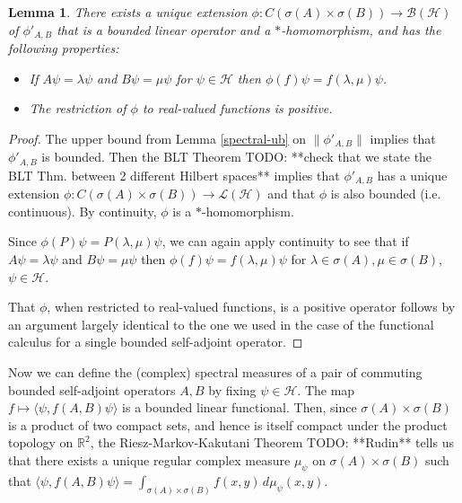 \documentclass[12pt,oneside]{report}
\newtheorem{lem}[thm]{Lemma}
\begin{document}
\begin{lem}
    There exists a unique extension $\phi: C(\sigma(A) \times \sigma(B)) \to \mathscr{B}(\mathscr{H})$ of $\phi'_{A,B}$ that is a bounded linear operator and a $*$-homomorphism, and has the following properties:
    \begin{itemize}
        \item If $A\psi = \lambda \psi$ and $B\psi = \mu \psi$ for $\psi \in \mathscr{H}$ then $\phi(f)\psi = f(\lambda,\mu)\psi$.
        \item The restriction of $\phi$ to real-valued functions is positive.
    \end{itemize}
\end{lem}
\begin{proof}
    The upper bound from Lemma \ref{spectral-ub} on $\|\phi'_{A,B}\|$ implies that $\phi'_{A,B}$ is bounded. Then the BLT Theorem TODO: **check that we state the BLT Thm. between 2 different Hilbert spaces** implies that $\phi'_{A,B}$ has a unique extension $\phi: C(\sigma(A) \times \sigma(B)) \to \mathscr{L}(\mathscr{H})$ and that $\phi$ is also bounded (i.e. continuous). By continuity, $\phi$ is a $*$-homomorphism.

    Since $\phi(P)\psi = P(\lambda,\mu)\psi$, we can again apply continuity to see that if $A\psi = \lambda \psi$ and $B\psi = \mu \psi$ then $\phi(f)\psi = f(\lambda,\mu)\psi$ for $\lambda \in \sigma(A), \mu \in \sigma(B)$, $\psi \in \mathscr{H}$.

    That $\phi$, when restricted to real-valued functions, is a positive operator follows by an argument largely identical to the one we used in the case of the functional calculus for a single bounded self-adjoint operator.
\end{proof}

Now we can define the (complex) spectral measures of a pair of commuting bounded self-adjoint operators $A,B$ by fixing $\psi \in \mathscr{H}$. The map $f \mapsto \langle \psi, f(A,B) \psi \rangle$ is a bounded linear functional. Then, since $\sigma(A) \times \sigma(B)$ is a product of two compact sets, and hence is itself compact under the product topology on $\mathbb{R}^{2}$, the Riesz-Markov-Kakutani Theorem TODO: **Rudin** tells us that there exists a unique regular complex measure $\mu_{\psi}$ on $\sigma(A) \times \sigma(B)$ such that $\langle \psi, f(A,B) \psi \rangle = \int _{\sigma(A) \times \sigma(B)} f(x,y) \, d\mu_{\psi}(x,y)$.
\end{document}

